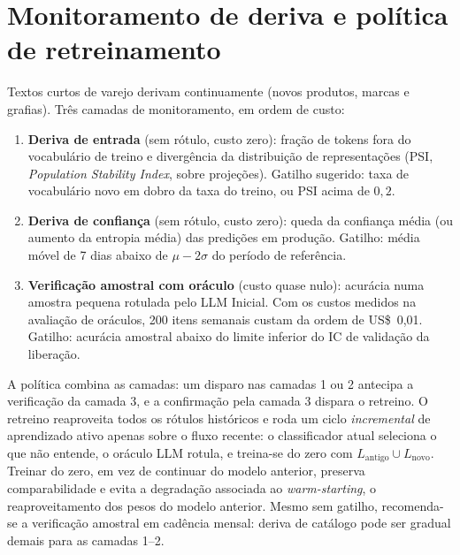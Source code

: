 \section{Monitoramento de deriva e política de retreinamento}
\label{ap:drift}

Textos curtos de varejo derivam continuamente (novos produtos, marcas e
grafias). Três camadas de monitoramento, em ordem de custo:

\begin{enumerate}
  \item \textbf{Deriva de entrada} (sem rótulo, custo zero): fração de tokens
  fora do vocabulário de treino e divergência da distribuição de
  representações (PSI, \textit{Population Stability Index}, sobre projeções). Gatilho sugerido: taxa de vocabulário
  novo em dobro da taxa do treino, ou PSI acima de $0{,}2$.
  \item \textbf{Deriva de confiança} (sem rótulo, custo zero): queda da
  confiança média (ou aumento da entropia média) das predições em produção.
  Gatilho: média móvel de 7 dias abaixo de $\mu - 2\sigma$ do período de
  referência.
  \item \textbf{Verificação amostral com oráculo} (custo quase nulo): acurácia
  numa amostra pequena rotulada pelo LLM Inicial. Com os custos medidos na
  avaliação de oráculos, 200 itens semanais custam da ordem de US\$~0,01. Gatilho: acurácia
  amostral abaixo do limite inferior do IC de validação da liberação.
\end{enumerate}

A política combina as camadas: um disparo nas camadas 1 ou 2 antecipa a
verificação da camada 3, e a confirmação pela camada 3 dispara o retreino. O retreino reaproveita todos os rótulos históricos e roda um ciclo
\emph{incremental} de aprendizado ativo apenas sobre o fluxo recente: o
classificador atual seleciona o que não entende, o oráculo LLM rotula, e
treina-se do zero com $L_{\text{antigo}} \cup L_{\text{novo}}$. Treinar do
zero, em vez de continuar do modelo anterior, preserva comparabilidade e
evita a degradação associada ao \textit{warm-starting}, o reaproveitamento
dos pesos do modelo anterior.
Mesmo sem gatilho, recomenda-se a verificação amostral em cadência mensal:
deriva de catálogo pode ser gradual demais para as camadas 1--2.
